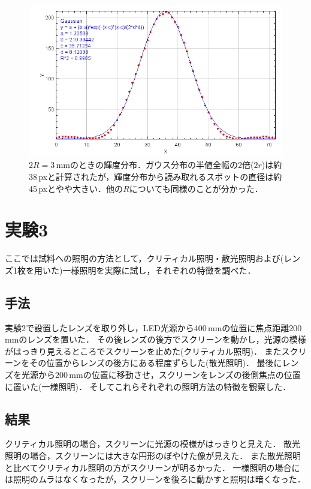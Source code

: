 \documentclass[titlepage]{jsarticle}
\begin{document}
\begin{figure}[htbp]
    \centering
    \includegraphics[width=13cm]{3mm.png}
    \caption{$2R=3$\,mmのときの輝度分布．ガウス分布の半値全幅の2倍($2r$)は約38\,pxと計算されたが，輝度分布から読み取れるスポットの直径は約45\,pxとやや大きい．他の$R$についても同様のことが分かった．}
    \label{fig:fitr}
\end{figure}

\section{実験3}
ここでは試料への照明の方法として，クリティカル照明・散光照明および(レンズ1枚を用いた)一様照明を実際に試し，それぞれの特徴を調べた．

\subsection{手法}
実験2で設置したレンズを取り外し，LED光源から400\,mmの位置に焦点距離200\,mmのレンズを置いた．
その後レンズの後方でスクリーンを動かし，光源の模様がはっきり見えるところでスクリーンを止めた(クリティカル照明)．
またスクリーンをその位置からレンズの後方にある程度ずらした(散光照明)．
最後にレンズを光源から200\,mmの位置に移動させ，スクリーンをレンズの後側焦点の位置に置いた(一様照明)．
そしてこれらそれぞれの照明方法の特徴を観察した．

\subsection{結果}
クリティカル照明の場合，スクリーンに光源の模様がはっきりと見えた．
散光照明の場合，スクリーンには大きな円形のぼやけた像が見えた．
また散光照明と比べてクリティカル照明の方がスクリーンが明るかった．
一様照明の場合には照明のムラはなくなったが，スクリーンを後ろに動かすと照明は暗くなった．
\end{document}
